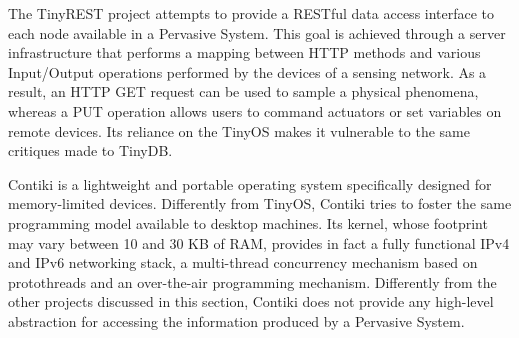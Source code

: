 The TinyREST \cite{luckenbach2005tinyrest} project attempts to provide a
RESTful \cite{fielding2000architectural} data access interface to each node
available in a Pervasive System. This goal is achieved through a server
infrastructure that performs a mapping between HTTP methods and various
Input/Output operations performed by the devices of a sensing network. As a
result, an HTTP GET request can be used to sample a physical phenomena, whereas
a PUT operation allows users to command actuators or set variables on remote
devices. Its reliance on the TinyOS makes it vulnerable to the same critiques
made to TinyDB.

Contiki \cite{dunkels2004contiki} is a lightweight and portable operating
system specifically designed for memory-limited devices. Differently from
TinyOS, Contiki tries to foster the same programming model available to desktop
machines. Its kernel, whose footprint may vary between 10 and 30 KB of RAM,
provides in fact a fully functional IPv4 and IPv6 networking stack, a
multi-thread concurrency mechanism based on protothreads and an over-the-air
programming mechanism. Differently from the other projects discussed in this
section, Contiki does not provide any high-level abstraction for accessing the
information produced by a Pervasive System.

